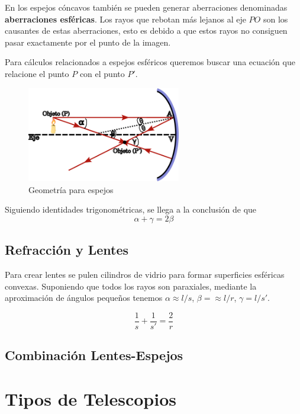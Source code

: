 En los espejos cóncavos también se pueden generar aberraciones denominadas \textbf{aberraciones esféricas}. Los rayos que rebotan más lejanos al eje $PO$ son los causantes de estas aberraciones, esto es debido a que estos rayos no consiguen pasar exactamente por el punto de la imagen.

Para cálculos relacionados a espejos esféricos queremos buscar una ecuación que relacione el punto $P$ con el punto $P'$. 

\begin{figure}[H]
	\centering
	\includegraphics[width=0.6\textwidth]{images/geometria_espejos.png}
	\caption{Geometría para espejos}
	\label{fig:geometria_espejos_imagen}
\end{figure}

Siguiendo identidades trigonométricas, se llega a la conclusión de que 
\begin{equation}
	\alpha + \gamma = 2\beta
\end{equation}


\subsection{Refracción y Lentes}
Para crear lentes se pulen cilindros de vidrio para formar superficies esféricas convexas. Suponiendo que todos los rayos son paraxiales, mediante la aproximación de ángulos pequeños tenemos $\alpha \approx l/s$, $\beta = \approx l/r$, $\gamma = l/s'$. 

\begin{equation}
	\frac{1}{s} + \frac{1}{s'} = \frac{2}{r}
\end{equation}



\subsection{Combinación Lentes-Espejos}


\section{Tipos de Telescopios}
